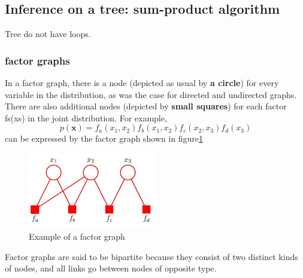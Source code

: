 \documentclass[a4paper]{book}
\renewcommand{\bf}{\mathbf}
\begin{document}
\subsection{Inference on a tree: sum-product algorithm}
Tree do not have loops.
\subsubsection{factor graphs}
In a factor graph, there is a node (depicted as usual by \textbf{a circle}) for every variable
in the distribution, as was the case for directed and undirected graphs. There are also
additional nodes (depicted by \textbf{small squares}) for each factor fs(xs) in the joint distribution.\newline
For example,
\begin{equation}\label{eq8.21}
  p(\bf{x}) = f_a(x_1,x_2)f_b(x_1,x_2)f_c(x_2,x_3)f_d(x_3)
\end{equation}
can be expressed by the factor graph shown in figure\ref{GM5}
\begin{figure}
  \centering
  \includegraphics[width=0.5\textwidth]{./imgs/GM5.jpg}
  \caption{Example of a factor graph}\label{GM5}
\end{figure}
Factor graphs are said to be bipartite because they consist of two distinct kinds
of nodes, and all links go between nodes of opposite type.
\end{document}
